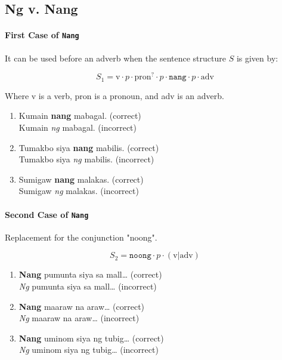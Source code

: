 \subsection{Ng v. Nang}

\paragraph{First Case of \texttt{Nang}} It can be used before an adverb when the sentence structure $S$ is given by:

\[
      S_1 = \text{v} \cdot p \cdot \text{pron}^? \cdot p \cdot \texttt{nang} \cdot p \cdot \text{adv}
\]

Where v is a verb, pron is a pronoun, and adv is an adverb.

\begin{example}
\end{example}

\begin{enumerate}
      \item Kumain \textbf{nang} mabagal. (correct)
            \\ Kumain \textit{ng} mabagal. (incorrect)
      \item Tumakbo siya \textbf{nang} mabilis. (correct)
            \\ Tumakbo siya \textit{ng} mabilis. (incorrect)
      \item Sumigaw \textbf{nang} malakas. (correct)
            \\ Sumigaw \textit{ng} malakas. (incorrect)
\end{enumerate}

\paragraph{Second Case of \texttt{Nang}} Replacement for the conjunction "noong".

\[
      S_2 = \texttt{noong} \cdot p \cdot (\text{v} \vert \text{adv})
\]

\begin{example}

\end{example}

\begin{enumerate}
      \item \textbf{Nang} pumunta siya sa mall… (correct)
        \\ \textit{Ng} pumunta siya sa mall… (incorrect)
      \item \textbf{Nang} maaraw na araw… (correct)
            \\ \textit{Ng} maaraw na araw… (incorrect)
            \item \textbf{Nang} uminom siya ng tubig… (correct)
            \\ \textit{Ng} uminom siya ng tubig… (incorrect)
\end{enumerate}

